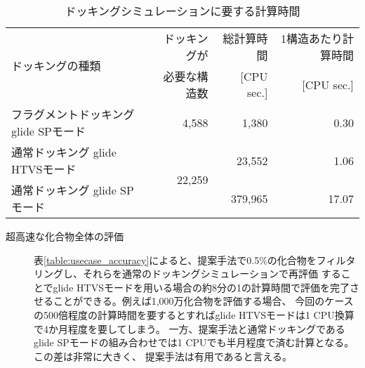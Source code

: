 \begin{table}[htbp] \centering
	\caption{ドッキングシミュレーションに要する計算時間}
	\label{table:usecase_speed}
	\begin{tabular}{l|rrr}
	\hline
	\multirow{2}{*}{ドッキングの種類}		&ドッキングが			&総計算時間	&1構造あたり計算時間	\\ 
									&必要な構造数		&[CPU sec.]			&[CPU sec.]			\\ \hline
	フラグメントドッキング glide SPモード		&4,588				&1,380				&0.30				\\
	通常ドッキング glide HTVSモード		&\multirow{2}{*}{22,259}	&23,552				&1.06				\\
	通常ドッキング glide SPモード			&					&379,965				&17.07				\\ \hline
	\end{tabular}
\end{table}


\begin{description}
\item[超高速な化合物全体の評価]
	表\ref{table:usecase_accuracy}によると、提案手法で0.5\%の化合物をフィルタリングし、それらを通常のドッキングシミュレーションで再評価
	することでglide HTVSモードを用いる場合の約8分の1の計算時間で評価を完了させることができる。例えば1,000万化合物を評価する場合、
	今回のケースの500倍程度の計算時間を要するとすればglide HTVSモードは1 CPU換算で4か月程度を要してしまう。
	一方、提案手法と通常ドッキングであるglide SPモードの組み合わせでは1 CPUでも半月程度で済む計算となる。この差は非常に大きく、
	提案手法は有用であると言える。
\end{description}
